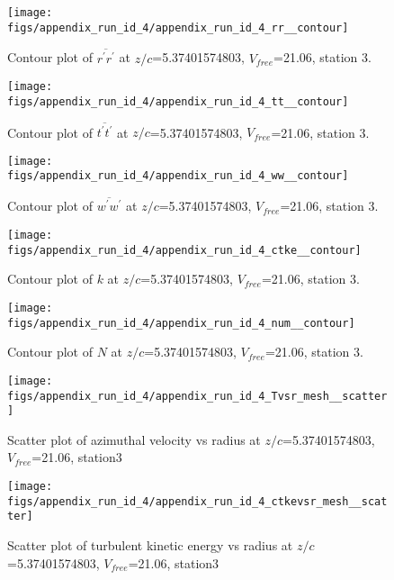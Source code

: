 \begin{figure}[H]
\centering
\texttt{[image: figs/appendix\_run\_id\_4/appendix\_run\_id\_4\_rr\_\_contour]}
\caption{Contour plot of $\overline{r^\prime r^\prime}$ at $z/c$=5.37401574803, $V_{free}$=21.06, station 3.}
\label{fig:appendix_run_id_4_rr__contour}
\end{figure}


\begin{figure}[H]
\centering
\texttt{[image: figs/appendix\_run\_id\_4/appendix\_run\_id\_4\_tt\_\_contour]}
\caption{Contour plot of $\overline{t^\prime t^\prime}$ at $z/c$=5.37401574803, $V_{free}$=21.06, station 3.}
\label{fig:appendix_run_id_4_tt__contour}
\end{figure}


\begin{figure}[H]
\centering
\texttt{[image: figs/appendix\_run\_id\_4/appendix\_run\_id\_4\_ww\_\_contour]}
\caption{Contour plot of $\overline{w^\prime w^\prime}$ at $z/c$=5.37401574803, $V_{free}$=21.06, station 3.}
\label{fig:appendix_run_id_4_ww__contour}
\end{figure}


\begin{figure}[H]
\centering
\texttt{[image: figs/appendix\_run\_id\_4/appendix\_run\_id\_4\_ctke\_\_contour]}
\caption{Contour plot of $k$ at $z/c$=5.37401574803, $V_{free}$=21.06, station 3.}
\label{fig:appendix_run_id_4_ctke__contour}
\end{figure}


\begin{figure}[H]
\centering
\texttt{[image: figs/appendix\_run\_id\_4/appendix\_run\_id\_4\_num\_\_contour]}
\caption{Contour plot of $N$ at $z/c$=5.37401574803, $V_{free}$=21.06, station 3.}
\label{fig:appendix_run_id_4_num__contour}
\end{figure}


\begin{figure}[H]
\centering
\texttt{[image: figs/appendix\_run\_id\_4/appendix\_run\_id\_4\_Tvsr\_mesh\_\_scatter]}
\caption{Scatter plot of azimuthal velocity vs radius at $z/c$=5.37401574803, $V_{free}$=21.06, station3}
\label{fig:appendix_run_id_4_Tvsr_mesh__scatter}
\end{figure}


\begin{figure}[H]
\centering
\texttt{[image: figs/appendix\_run\_id\_4/appendix\_run\_id\_4\_ctkevsr\_mesh\_\_scatter]}
\caption{Scatter plot of turbulent kinetic energy vs radius at $z/c$=5.37401574803, $V_{free}$=21.06, station3}
\label{fig:appendix_run_id_4_ctkevsr_mesh__scatter}
\end{figure}



